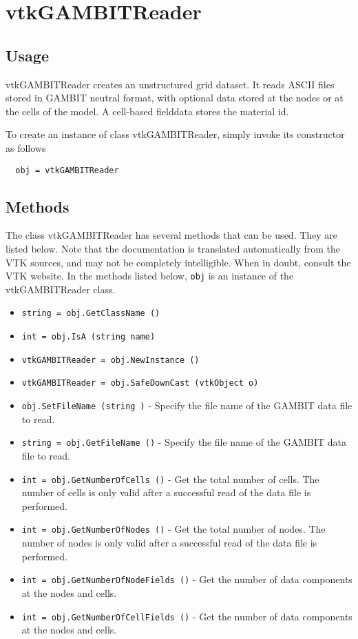 \section{vtkGAMBITReader}

\subsection{Usage}

 vtkGAMBITReader creates an unstructured grid dataset. It reads ASCII files
 stored in GAMBIT neutral format, with optional data stored at the nodes or
 at the cells of the model. A cell-based fielddata stores the material id.

To create an instance of class vtkGAMBITReader, simply
invoke its constructor as follows
\begin{verbatim}
  obj = vtkGAMBITReader
\end{verbatim}
\subsection{Methods}

The class vtkGAMBITReader has several methods that can be used.
  They are listed below.
Note that the documentation is translated automatically from the VTK sources,
and may not be completely intelligible.  When in doubt, consult the VTK website.
In the methods listed below, \verb|obj| is an instance of the vtkGAMBITReader class.
\begin{itemize}
\item  \verb|string = obj.GetClassName ()|

\item  \verb|int = obj.IsA (string name)|

\item  \verb|vtkGAMBITReader = obj.NewInstance ()|

\item  \verb|vtkGAMBITReader = obj.SafeDownCast (vtkObject o)|

\item  \verb|obj.SetFileName (string )| -  Specify the file name of the GAMBIT data file to read.

\item  \verb|string = obj.GetFileName ()| -  Specify the file name of the GAMBIT data file to read.

\item  \verb|int = obj.GetNumberOfCells ()| -  Get the total number of cells. The number of cells is only valid after a
 successful read of the data file is performed.

\item  \verb|int = obj.GetNumberOfNodes ()| -  Get the total number of nodes. The number of nodes is only valid after a
 successful read of the data file is performed.

\item  \verb|int = obj.GetNumberOfNodeFields ()| -  Get the number of data components at the nodes and cells.

\item  \verb|int = obj.GetNumberOfCellFields ()| -  Get the number of data components at the nodes and cells.

\end{itemize}
